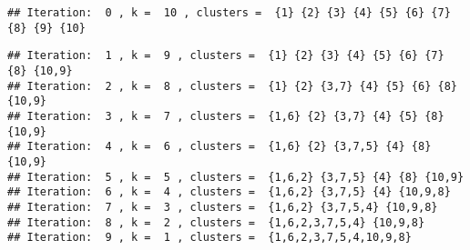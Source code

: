 \documentclass[
]{book}
\newenvironment{Shaded}{\begin{snugshade}}{\end{snugshade}}
\newcommand{\AttributeTok}[1]{\textcolor[rgb]{0.77,0.63,0.00}{#1}}
\newcommand{\CommentTok}[1]{\textcolor[rgb]{0.56,0.35,0.01}{\textit{#1}}}
\newcommand{\ControlFlowTok}[1]{\textcolor[rgb]{0.13,0.29,0.53}{\textbf{#1}}}
\newcommand{\DecValTok}[1]{\textcolor[rgb]{0.00,0.00,0.81}{#1}}
\newcommand{\FunctionTok}[1]{\textcolor[rgb]{0.00,0.00,0.00}{#1}}
\newcommand{\NormalTok}[1]{#1}
\newcommand{\OtherTok}[1]{\textcolor[rgb]{0.56,0.35,0.01}{#1}}
\newcommand{\SpecialCharTok}[1]{\textcolor[rgb]{0.00,0.00,0.00}{#1}}
\newcommand{\StringTok}[1]{\textcolor[rgb]{0.31,0.60,0.02}{#1}}
\begin{document}
\begin{verbatim}
## Iteration:  0 , k =  10 , clusters =  {1} {2} {3} {4} {5} {6} {7} {8} {9} {10}
\end{verbatim}

\begin{Shaded}
\end{Shaded}

\begin{verbatim}
## Iteration:  1 , k =  9 , clusters =  {1} {2} {3} {4} {5} {6} {7} {8} {10,9} 
## Iteration:  2 , k =  8 , clusters =  {1} {2} {3,7} {4} {5} {6} {8} {10,9} 
## Iteration:  3 , k =  7 , clusters =  {1,6} {2} {3,7} {4} {5} {8} {10,9} 
## Iteration:  4 , k =  6 , clusters =  {1,6} {2} {3,7,5} {4} {8} {10,9} 
## Iteration:  5 , k =  5 , clusters =  {1,6,2} {3,7,5} {4} {8} {10,9} 
## Iteration:  6 , k =  4 , clusters =  {1,6,2} {3,7,5} {4} {10,9,8} 
## Iteration:  7 , k =  3 , clusters =  {1,6,2} {3,7,5,4} {10,9,8} 
## Iteration:  8 , k =  2 , clusters =  {1,6,2,3,7,5,4} {10,9,8} 
## Iteration:  9 , k =  1 , clusters =  {1,6,2,3,7,5,4,10,9,8}
\end{verbatim}
\end{document}
